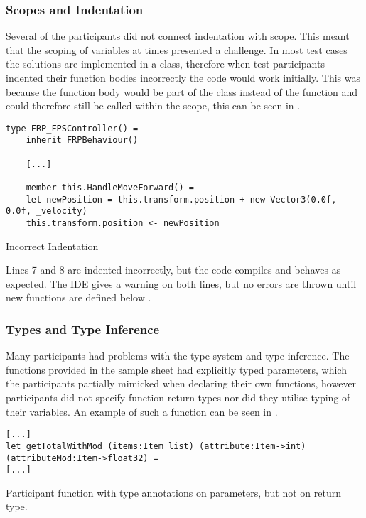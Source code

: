 \subsubsection{Scopes and Indentation}
Several of the participants did not connect indentation with scope. This meant that the scoping of variables at times presented a challenge. In most test cases the solutions are implemented in a class, therefore when test participants indented their function bodies incorrectly the code would work initially. This was because the function body would be part of the class instead of the function and could therefore still be called within the scope, this can be seen in .

\begin{listing}[H]
\begin{verbatim}
type FRP_FPSController() =
    inherit FRPBehaviour()

    [...]

    member this.HandleMoveForward() =
    let newPosition = this.transform.position + new Vector3(0.0f, 0.0f, _velocity)
    this.transform.position <- newPosition
\end{verbatim}
\caption{Incorrect Indentation}
\label{lst:scope-prob}
\end{listing}

Lines 7 and 8 are indented incorrectly, but the code compiles and behaves as expected. The \gls{IDE} gives a warning on both lines, but no errors are thrown until new  functions are defined below .

\subsubsection{Types and Type Inference}
Many participants had problems with the type system and type inference. The functions provided in the sample sheet had explicitly typed parameters, which the participants partially mimicked when declaring their own functions, however participants did not specify function return types nor did they utilise typing of their variables. An example of such a function can be seen in .

\begin{listing}[H]
\begin{verbatim}
[...]
let getTotalWithMod (items:Item list) (attribute:Item->int) (attributeMod:Item->float32) =
[...]
\end{verbatim}
\caption{Participant function with type annotations on parameters, but not on return type.}
\label{lst:part-func}
\end{listing}

